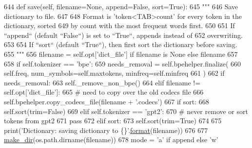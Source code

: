 \begin{DoxyCode}
644     \textcolor{keyword}{def }save(self, filename=None, append=False, sort=True):
645         \textcolor{stringliteral}{"""}
646 \textcolor{stringliteral}{        Save dictionary to file.}
647 \textcolor{stringliteral}{}
648 \textcolor{stringliteral}{        Format is 'token<TAB>count' for every token in the dictionary, sorted}
649 \textcolor{stringliteral}{        by count with the most frequent words first.}
650 \textcolor{stringliteral}{}
651 \textcolor{stringliteral}{        If ``append`` (default ``False``) is set to ``True``, appends instead of}
652 \textcolor{stringliteral}{        overwriting.}
653 \textcolor{stringliteral}{}
654 \textcolor{stringliteral}{        If ``sort`` (default ``True``), then first sort the dictionary before saving.}
655 \textcolor{stringliteral}{        """}
656         filename = self.opt[\textcolor{stringliteral}{'dict\_file'}] \textcolor{keywordflow}{if} filename \textcolor{keywordflow}{is} \textcolor{keywordtype}{None} \textcolor{keywordflow}{else} filename
657 
658         \textcolor{keywordflow}{if} self.tokenizer == \textcolor{stringliteral}{'bpe'}:
659             needs\_removal = self.bpehelper.finalize(
660                 self.freq, num\_symbols=self.maxtokens, minfreq=self.minfreq
661             )
662             \textcolor{keywordflow}{if} needs\_removal:
663                 self.\_remove\_non\_bpe()
664             \textcolor{keywordflow}{elif} filename != self.opt[\textcolor{stringliteral}{'dict\_file'}]:
665                 \textcolor{comment}{# need to copy over the old codecs file}
666                 self.bpehelper.copy\_codecs\_file(filename + \textcolor{stringliteral}{'.codecs'})
667             \textcolor{keywordflow}{if} sort:
668                 self.sort(trim=\textcolor{keyword}{False})
669         \textcolor{keywordflow}{elif} self.tokenizer == \textcolor{stringliteral}{'gpt2'}:
670             \textcolor{comment}{# never remove or sort tokens from gpt2}
671             \textcolor{keywordflow}{pass}
672         \textcolor{keywordflow}{elif} sort:
673             self.sort(trim=\textcolor{keyword}{True})
674 
675         print(\textcolor{stringliteral}{'Dictionary: saving dictionary to \{\}'}.\hyperlink{namespaceparlai_1_1chat__service_1_1services_1_1messenger_1_1shared__utils_a32e2e2022b824fbaf80c747160b52a76}{format}(filename))
676 
677         \hyperlink{namespaceparlai_1_1core_1_1build__data_a6ce042fedd4194bd016845bbe7a8facf}{make\_dir}(os.path.dirname(filename))
678         mode = \textcolor{stringliteral}{'a'} \textcolor{keywordflow}{if} append \textcolor{keywordflow}{else} \textcolor{stringliteral}{'w'}

\end{DoxyCode}
